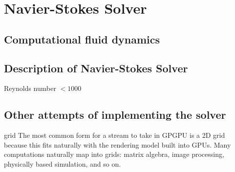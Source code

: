 \chapter{Navier-Stokes Solver}

\section{Computational fluid dynamics}

\section{Description of Navier-Stokes Solver}

Reynolds number $< 1000$

\section{Other attempts of implementing the solver}

grid The most common form for a stream to take in GPGPU is a 2D grid because this fits naturally with the rendering model built into GPUs. Many computations naturally map into grids: matrix algebra, image processing, physically based simulation, and so on.